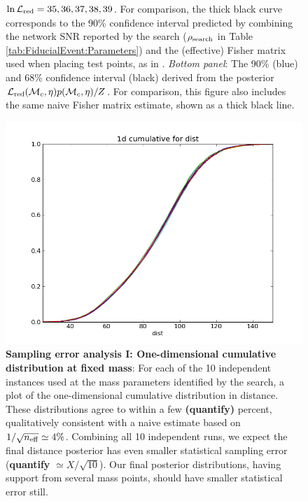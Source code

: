 \begin{figure}
{  $\ln {\cal L}_{\rm red}=35,36,37,38,39$.   For comparison, the thick black curve corresponds to the 90\% confidence interval
  predicted by combining the network SNR reported by the search ($\rho_{\rm search}$ in Table \ref{tab:FiducialEvent:Parameters}) and the (effective)
  Fisher matrix used when placing test points, as in \cite{gwastro-mergers-HeeSuk-FisherMatrixWithAmplitudeCorrections,gwastro-mergers-HeeSuk-CompareToPE-Aligned,gwastro-mergers-HeeSuk-CompareToPE-Precessing}.  
\emph{Bottom panel}: The 90\% (blue) and 68\% confidence interval (black) derived from the posterior ${\cal L}_{\rm red}({{\cal M}_c},\eta)
p({{\cal M}_c},\eta)/Z$.  For comparison, this figure also includes the same naive Fisher matrix estimate, shown as a thick black line.
}
\end{figure}



\begin{figure}
\includegraphics[width=\columnwidth]{../Figures/v2runs_coinc_id_833_cumulative-multiplot-distance-MASS_SET_0}
\caption{\label{fig:FiducialEvent:Cumulatives:Comparison:TriggerMasses}\textbf{Sampling error analysis I: One-dimensional cumulative distribution at fixed mass}:  For each of the 10 independent
  instances used at  the mass  parameters   identified by the search, a plot of the one-dimensional cumulative
  distribution in distance.  These distributions agree to within a few \textbf{(quantify)} percent, qualitatively
  consistent with a naive estimate based on $1/\sqrt{n_{\rm eff}} \simeq 4\%$.   Combining all 10
  independent runs, we expect the final distance posterior has even smaller statistical sampling error
  (\textbf{quantify} $\simeq X/\sqrt{10}$).  Our final posterior
  distributions, having support from several mass points, should have smaller statistical error still.
}
\end{figure}

